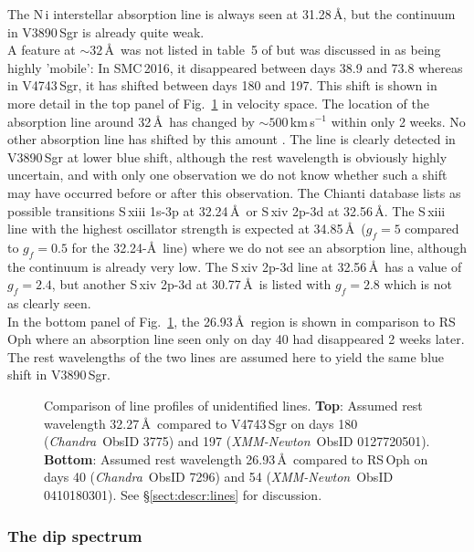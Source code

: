 \documentclass{aa}
\newcommand{\chandra}{{\it Chandra}}
\newcommand{\xmm}{{\it XMM-Newton}}
\begin{document}
The N\,{\sc i} interstellar absorption line is always seen at 31.28\,\AA,
but the continuum in V3890\,Sgr is already quite weak.\\

A feature at $\sim 32$\,\AA\ was not listed in table~5 of \cite{nessv2491} but
was discussed in \cite{nesscospar} as being highly 'mobile': In
SMC\,2016, it disappeared between days 38.9 and 73.8 whereas in
V4743\,Sgr, it has shifted between days 180 and 197. This shift is shown
in more detail in the top panel of Fig.~\ref{fig:32} in velocity space.
The location of the absorption line
around 32\,\AA\ has changed by $\sim 500$\,km\,s$^{-1}$ within
only 2 weeks. No other absorption line has shifted by this amount
\citep{nesscospar}. The line is clearly detected in V3890\,Sgr at lower
blue shift, although the rest wavelength is obviously highly uncertain,
and with only one observation we do not know whether such a shift may
have occurred before or after this observation.
The Chianti database lists as possible transitions
S\,{\sc xiii} 1s-3p at 32.24\,\AA\ or S\,{\sc xiv} 2p-3d at 32.56\,\AA.
The S\,{\sc xiii} line with the highest oscillator strength is expected
at 34.85\,\AA\ ($g_f=5$ compared to $g_f=0.5$ for the 32.24-\AA\ line)
where we do not see an absorption line, although the continuum is already
very low. The S\,{\sc xiv} 2p-3d line at 32.56\,\AA\ has a value of $g_f=2.4$,
but another S\,{\sc xiv} 2p-3d at 30.77\,\AA\ is listed with $g_f=2.8$
which is not as clearly seen.\\

In the bottom panel of Fig.~\ref{fig:32}, the 26.93\,\AA\ region is shown
in comparison to RS\,Oph where an absorption line seen only on day 40
had disappeared 2 weeks later.
The rest wavelengths of the two lines are assumed here to yield the same
blue shift in V3890\,Sgr.

\begin{figure}[!ht]
\caption{\label{fig:32}Comparison of line profiles of unidentified lines.
{\bf Top}:
Assumed rest wavelength 32.27\,\AA\ compared to V4743\,Sgr
on days 180 (\chandra\ ObsID 3775) and 197 (\xmm\ ObsID
0127720501).
{\bf Bottom}: Assumed rest wavelength 26.93\,\AA\
compared to RS\,Oph on days 40
(\chandra\ ObsID 7296) and 54 (\xmm\ ObsID 0410180301).
See \S\ref{sect:descr:lines} for discussion.
}
\end{figure}

\subsubsection{The dip spectrum}
\label{sect:descr:dip}
\end{document}

